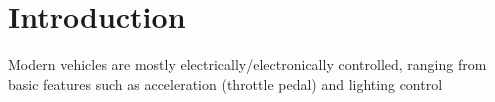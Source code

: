 \section{Introduction}
Modern vehicles are mostly electrically/electronically controlled, ranging from basic features such as acceleration (throttle pedal) and lighting control
